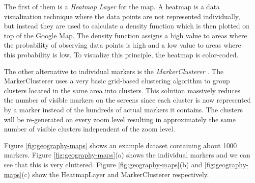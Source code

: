 The first of them is a \textit{Heatmap Layer} \cite{HeatmapLayer} for the map. A heatmap is a data visualization technique where the data points are not represented individually, but instead they are used to calculate a density function which is then plotted on top of the Google Map. The density function assigns a high value to areas where the probability of observing data points is high and a low value to areas where this probability is low. To visualize this principle, the heatmap is color-coded.

The other alternative to individual markers is the \textit{MarkerClusterer} \cite{MarkerClusterer}. The MarkerClusterer uses a very basic grid-based clustering algorithm to group clusters located in the same area into clusters. This solution massively reduces the number of visible markers on the screens since each cluster is now represented by a marker instead of the hundreds of actual markers it contains. The clusters will be re-generated on every zoom level resulting in approximately the same number of visible clusters independent of the zoom level.

Figure \ref{fig:geography-maps} shows an example dataset containing about 1000 markers. Figure \ref{fig:geography-maps}(a) shows the individual markers and we can see that this is very cluttered. Figure \ref{fig:geography-maps}(b) and \ref{fig:geography-maps}(c) show the HeatmapLayer and MarkerClusterer respectively. 

